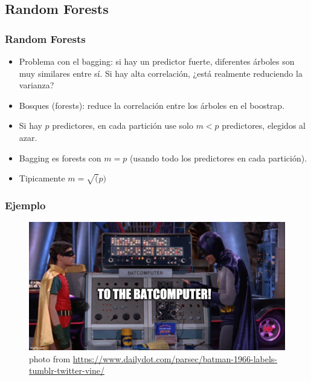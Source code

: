 \documentclass[
  shownotes,
  xcolor={svgnames},
  hyperref={colorlinks,citecolor=DarkBlue,linkcolor=andesred,urlcolor=DarkBlue}
  , aspectratio=169]{beamer}
\begin{document}
\subsection{Random Forests }
\begin{frame}[fragile]
\frametitle{Random Forests}

\begin{itemize}
  \item Problema con el bagging: si hay un predictor fuerte, diferentes árboles son muy similares entre sí. Si hay alta correlación, ¿está realmente reduciendo la varianza?
\bigskip
\item Bosques (forests): reduce la correlación entre los árboles  en el boostrap.
\bigskip
\item Si hay $p$ predictores, en cada partición use solo  $m <p$ predictores, elegidos al azar.
\bigskip
\item Bagging es forests con $m = p$ (usando todo los predictores en cada partición).
\bigskip
\item Tipicamente $m = \sqrt(p)$
\end{itemize}

\end{frame}

\begin{frame}[fragile]
\frametitle{Ejemplo}
\begin{figure}[H] \centering
  \centering
  \includegraphics[scale=0.35]{figures/baticomputer_meme.jpg}
  \\
  \tiny photo from \url{https://www.dailydot.com/parsec/batman-1966-labels-tumblr-twitter-vine/}
\end{figure}

\end{frame}
\end{document}
